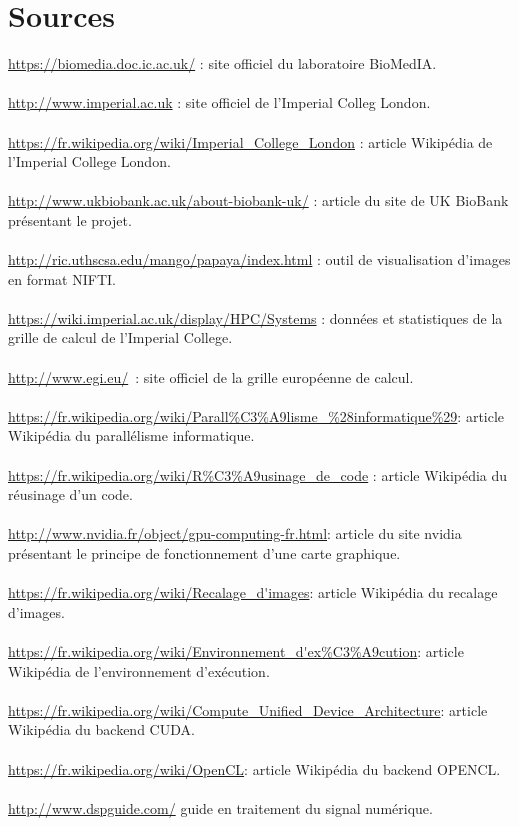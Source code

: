 \documentclass[10pt]{report}
\begin{document}
\chapter*{Sources}
\noindent
\url{https://biomedia.doc.ic.ac.uk/}  : site officiel du laboratoire BioMedIA. \\
\\
\url{http://www.imperial.ac.uk} : site officiel de l'Imperial Colleg London.\\
\\
\url{https://fr.wikipedia.org/wiki/Imperial_College_London} : article Wikipédia de l'Imperial College London.\\
\\
\url{http://www.ukbiobank.ac.uk/about-biobank-uk/} : article du site de UK BioBank présentant le projet.\\
\\
\url{http://ric.uthscsa.edu/mango/papaya/index.html} : outil de visualisation d'images en format NIFTI.\\
\\
\url{https://wiki.imperial.ac.uk/display/HPC/Systems} : données et statistiques de la grille de calcul de l'Imperial College.\\
\\
\url{http://www.egi.eu/} : site officiel de la grille européenne de calcul.\\
\\
\url{https://fr.wikipedia.org/wiki/Parall\%C3\%A9lisme_\%28informatique\%29}: article Wikipédia du parallélisme informatique.\\
\\
\url{https://fr.wikipedia.org/wiki/R\%C3\%A9usinage_de_code} : article Wikipédia du réusinage d'un code. \\
\\
\url{http://www.nvidia.fr/object/gpu-computing-fr.html}: article du site nvidia présentant le principe de fonctionnement d'une carte graphique.\\
\\
\url{https://fr.wikipedia.org/wiki/Recalage_d'images}: article Wikipédia du recalage d'images.\\
\\
\url{https://fr.wikipedia.org/wiki/Environnement_d'ex\%C3\%A9cution}: article Wikipédia de l'environnement d'exécution.\\
\\
\url{https://fr.wikipedia.org/wiki/Compute_Unified_Device_Architecture}: article Wikipédia du backend CUDA.\\
\\
\url{https://fr.wikipedia.org/wiki/OpenCL}: article Wikipédia du backend OPENCL.\\
\\
\url{http://www.dspguide.com/} guide en traitement du signal numérique.\\
\\
\renewcommand{\listfigurename}{Table des illustations}\listoffigures 
{}
\end{document}
